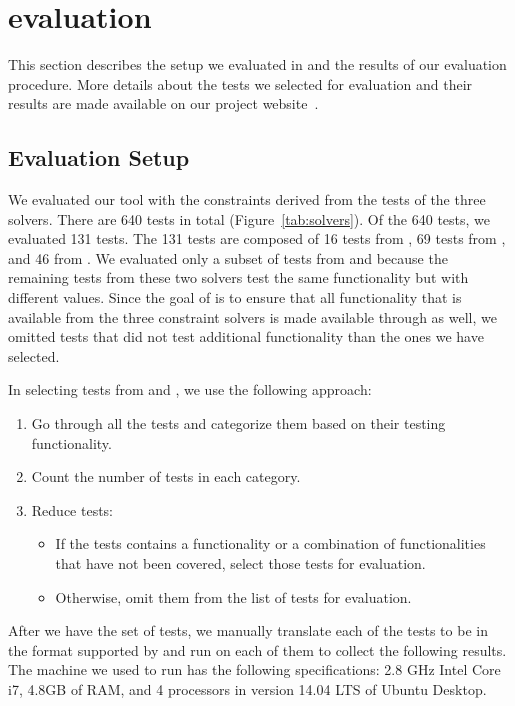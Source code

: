 \section{evaluation}
\newcommand{\totaltests}{640\xspace}
\newcommand{\pickedtests}{131\xspace}
\newcommand{\dprlePtests}{16\xspace}
\newcommand{\hampiPtests}{69\xspace}
\newcommand{\zPtests}{46\xspace}

This section describes the setup we evaluated \imss in and the results of our evaluation procedure. More details about the tests we selected for evaluation and their results are made available on our project website~\cite{imss}.

\label{sec:evaluation}
\subsection{Evaluation Setup}
We evaluated our tool with the constraints derived from the tests of the three solvers.
There are \totaltests tests in total (Figure~\ref{tab:solvers}). Of the \totaltests
tests, we evaluated \pickedtests tests. The \pickedtests tests are composed of
\dprlePtests tests from \dprle, \hampiPtests tests from \hampi, and \zPtests from \zstr.
We evaluated only a subset of tests from \hampi and \zstr because the remaining tests
from these two solvers test the same functionality but with different values.
Since the goal of \imss is to ensure that all functionality that is available
from the three constraint solvers is made available through \imss as well, we
omitted tests that did not test additional functionality than the ones we have
selected.

In selecting tests from \zstr and \hampi,
we use the following approach:
\begin{enumerate}
    \item Go through all the tests and categorize them based on their testing functionality.
    \item Count the number of tests in each category.
    \item Reduce tests:
        \begin{itemize}
            \item If the tests contains a functionality or a combination of functionalities that have not been covered, select those tests for evaluation.
            \item Otherwise, omit them from the list of tests for evaluation.
        \end{itemize}
\end{enumerate}
After we have the set of tests, we manually translate each of the tests to be in the
format supported by \imss and run \imss on each of them to collect the following results.
The machine we used to run \imss has the following specifications: 2.8 GHz Intel Core i7, 4.8GB of RAM, and 4 processors in version 14.04 LTS of Ubuntu Desktop.


